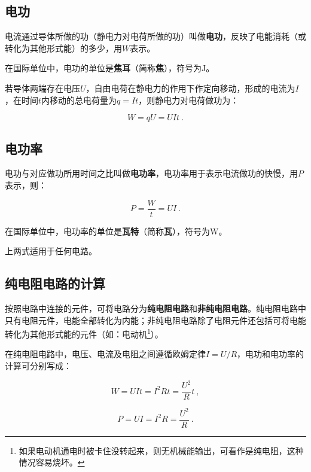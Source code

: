
\subsection{电功}

电流通过导体所做的功（静电力对电荷所做的功）叫做\textbf{电功}，反映了电能消耗（或转化为其他形式能）的多少，用$W$表示。

在国际单位中，电功的单位是\textbf{焦耳}（简称\textbf{焦}），符号为$\mathrm{J}$。

若导体两端存在电压$U$，自由电荷在静电力的作用下作定向移动，形成的电流为$I$，在时间$t$内移动的总电荷量为$q=It$，则静电力对电荷做功为：

\begin{equation}
W=qU=UIt~.
\end{equation}

\subsection{电功率}

电功与对应做功所用时间之比叫做\textbf{电功率}，电功率用于表示电流做功的快慢，用$P$表示，则：

\begin{equation}
P=\frac{W}{t}=UI~.
\end{equation}

在国际单位中，电功率的单位是\textbf{瓦特}（简称\textbf{瓦}），符号为$\mathrm{W}$。

上两式适用于任何电路。

\subsection{纯电阻电路的计算}

按照电路中连接的元件，可将电路分为\textbf{纯电阻电路}和\textbf{非纯电阻电路}。纯电阻电路中只有电阻元件，电能全部转化为内能；非纯电阻电路除了电阻元件还包括可将电能转化为其他形式能的元件（如：电动机\footnote{如果电动机通电时被卡住没转起来，则无机械能输出，可看作是纯电阻，这种情况容易烧坏。}）。

在纯电阻电路中，电压、电流及电阻之间遵循欧姆定律$I=U/R$，电功和电功率的计算可分别写成：

\begin{equation}
W=UIt=I^2 Rt=\frac{U^2}{R}t~,
\end{equation}

\begin{equation}
P=UI=I^2 R=\frac{U^2}{R}~.
\end{equation}

